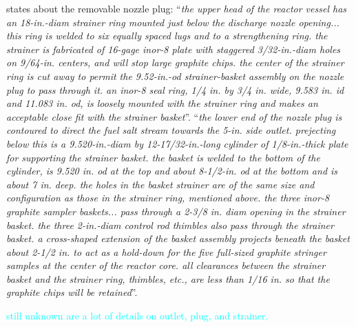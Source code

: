 \documentclass{article}
\begin{document}
\begin{preview}
\parencite[page 105]{ornl-tm-0728} states about the removable nozzle plug: \enquote{\textit{the upper head of the reactor vessel has an 18-in.-diam strainer ring mounted just below the discharge nozzle opening... this ring is welded to six equally spaced lugs and to a strengthening ring. the strainer is fabricated of 16-gage inor-8 plate with staggered 3/32-in.-diam holes on 9/64-in. centers, and will stop large graphite chips. the center of the strainer ring is cut away to permit the 9.52-in.-od strainer-basket assembly on the nozzle plug to pass through it. an inor-8 seal ring, 1/4 in. by 3/4 in. wide, 9.583 in. id and 11.083 in. od, is loosely mounted with the strainer ring and makes an acceptable close fit with the strainer basket}}.
\enquote{\textit{the lower end of the nozzle plug is contoured to direct the fuel salt stream towards the 5-in. side outlet. prejecting below this is a 9.520-in.-diam by 12-17/32-in.-long cylinder of 1/8-in.-thick plate for supporting the strainer basket. the basket is welded to the bottom of the cylinder, is 9.520 in. od at the top and about 8-1/2-in. od at the bottom and is about 7 in. deep. the holes in the basket strainer are of the same size and configuration as those in the strainer ring, mentioned above. the three inor-8 graphite sampler baskets... pass through a 2-3/8 in. diam opening in the strainer basket. the three 2-in.-diam control rod thimbles also pass through the strainer basket. a cross-shaped extension of the basket assembly projects beneath the basket about 2-1/2 in. to act as a hold-down for the five full-sized graphite stringer samples at the center of the reactor core. all clearances between the strainer basket and the strainer ring, thimbles, etc., are less than 1/16 in. so that the graphite chips will be retained}}.



\textcolor{cyan}{still unknown are a lot of details on outlet, plug, and strainer.}



\end{preview}
\end{document}
